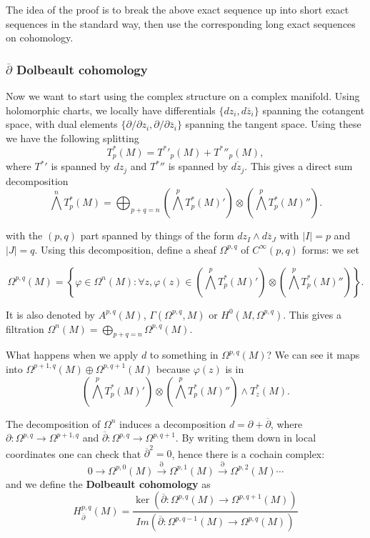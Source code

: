 The idea of the proof is to break the above exact sequence up into short exact sequences in the standard way, then use the corresponding long exact sequences on cohomology.

\subsubsection{$\overline{\partial}$ Dolbeault cohomology}

Now we want to start using the complex structure on a complex manifold. Using holomorphic charts, we locally have differentials $\{dz_i,d\overline{z}_i\}$ spanning the cotangent space, with dual elements $\{\partial/\partial z_i,\partial/\partial \overline{z}_i\}$ spanning the tangent space. Using these we have the following splitting
$$T^*_p(M)={T^*}'_p(M)+{T^*}{''}_p(M),$$ 
where ${T^*}'$ is spanned by $dz_j$ and ${T^*}{''}$ is spanned by $\overline{dz_j}$. This gives a direct sum decomposition 
$$\bigwedge^nT^*_p(M)=\bigoplus_{p+q=n}\left(\bigwedge^p {T^*_p(M)}'\right)\otimes \left(\bigwedge^p {T^*_p}(M){''}\right).$$ 

with the $(p,q)$ part spanned by things of the form $dz_I\wedge d\overline{z}_J$ with $|I|=p$ and $|J|=q$. Using this decomposition, define a sheaf $\Omega^{p,q}$ of $C^\infty(p,q)$ forms: we set

$$\Omega^{p,q}(M)=\left\{ \varphi \in \Omega^n(M): \forall z, \varphi(z)\in \left(\bigwedge^p {T^*_p(M)}'\right)\otimes \left(\bigwedge^p {T^*_p}(M){''}\right)\right\}.$$

It is also denoted by $A^{p,q}(M)$, $\Gamma(\Omega^{p,q},M)$ or $H^0(M,\Omega^{p,q})$. This gives a filtration $\Omega^n(M)=\bigoplus_{p+q=n} \Omega^{p,q}(M)$.

What happens when we apply $d$ to something in $\Omega^{p,q}(M)$? We can see it maps into $\Omega^{p+1,q}(M)\oplus \Omega^{p,q+1}(M)$ because $\varphi(z)$ is in 
$$\left(\bigwedge^p {T^*_p(M)}'\right)\otimes \left(\bigwedge^p {T^*_p}(M){''}\right)\wedge T_z^*(M).$$


The decomposition of $\Omega^n$ induces a decomposition $d=\partial+\overline{\partial}$, where $\partial: \Omega^{p,q}\rightarrow\Omega^{p+1,q}$ and $\overline{\partial}:\Omega^{p,q}\rightarrow\Omega^{p,q+1}$. By writing them down in local coordinates one can check that $\overline{\partial}^2=0$, hence there is a cochain complex:
$$0\rightarrow\Omega^{p,0}(M)\xrightarrow{\partial}\Omega^{p,1}(M)\xrightarrow{\partial}\Omega^{p,2}(M)\cdots$$
and we define the \textbf{Dolbeault cohomology} as
$$H^{p,q}_{\overline{\partial}}(M)=\frac{\ker(\overline{\partial}: \Omega^{p,q}(M)\to \Omega^{p,q+1}(M))}{Im(\overline{\partial}:\Omega^{p,q-1}(M)\to \Omega^{p,q}(M))}$$

